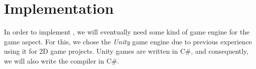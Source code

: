 \chapter{Implementation} \label{chap:implementation}
In order to implement \dazel{}, we will eventually need some kind of game engine for the game aspect.
For this, we chose the \textit{Unity} game engine\cite{technologies_unity_nodate} due to previous experience using it for 2D game projects.
Unity games are written in C\#, and consequently, we will also write the \dazel{} compiler in C\#. 